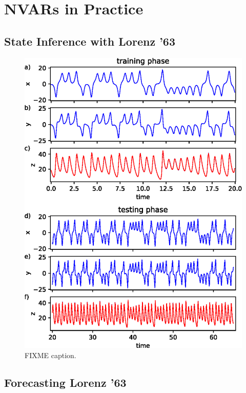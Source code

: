 \chapter{NVARs in Practice}\label{ch:nvar-application}

\section{State Inference with Lorenz '63}

\begin{figure}
  \includegraphics{figures/nvar-infer-lorenz}
  \caption{FIXME caption.}
  \label{fig:nvar-infer-lorenz}
\end{figure}

\section{Forecasting Lorenz '63}

